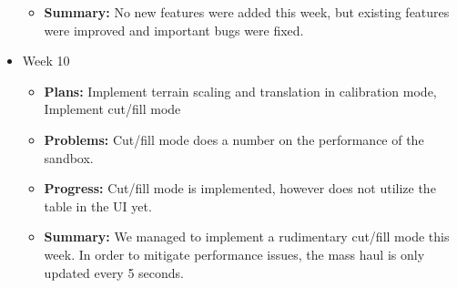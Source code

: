 \documentclass[onecolumn, draftclsnofoot,10pt, compsoc]{IEEEtran}
\begin{document}
\begin{itemize}
\begin{itemize}
    \item \textbf{Summary:} No new features were added this week, but existing features were improved and important bugs were fixed.
	\end{itemize}
\item Week 10
	\begin{itemize}
	\item \textbf{Plans:} Implement terrain scaling and translation in calibration mode, Implement cut/fill mode
    \item \textbf{Problems:} Cut/fill mode does a number on the performance of the sandbox.
    \item \textbf{Progress:} Cut/fill mode is implemented, however does not utilize the table in the UI yet.
    \item \textbf{Summary:} We managed to implement a rudimentary cut/fill mode this week. In order to mitigate performance issues, the mass haul is only updated every 5 seconds.
	\end{itemize}
\end{itemize}
\end{document}
